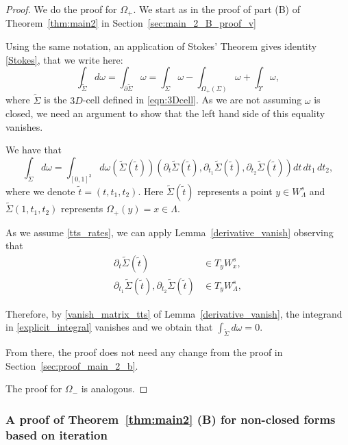 \documentclass[11pt]{amsart}
\theoremstyle{definition}
\theoremstyle{remark}
\numberwithin{equation}{section}
\begin{document}
  \begin{proof}
  We do the proof for $\Omega_+$.
    We start as in the proof of part (B) of
    Theorem~\ref{thm:main2} in Section~\ref{sec:main_2_B_proof_v}

    Using the same notation, an application of
    Stokes' Theorem gives identity \eqref{Stokes}, that we write here:
\[ \int_{\tilde\Sigma } d\omega =
\int_{\partial \tilde\Sigma}\omega =
\int_\Sigma \omega-\int_{\Omega_+(\Sigma)}\omega+\int_\Upsilon \omega,
\]
where $\tilde \Sigma$ is the $3D$-cell defined in \eqref{eqn:3Dcell}.
As we are not assuming $\omega$ is closed, we need an argument to show that the left hand side of this equality vanishes.

We have that
\begin{equation} \label{explicit_integral}
\int_{\tilde \Sigma} d\omega = \int_{[0,1]^3}
d\omega \left(\tilde \Sigma(\tilde t)\right) \left( \partial_t \tilde \Sigma(\tilde t),
\partial_{t_1}\tilde \Sigma(\tilde t), \partial_{t_2} \tilde \Sigma(\tilde t)\right)
dt \, dt_1 \, dt_2 ,
\end{equation}
where we denote $\tilde t=(t,t_1,t_2)$.
Here $\tilde \Sigma(\tilde t)$ represents a point $y\in W^s_\Lambda$ and
  $\tilde \Sigma(1,t_1,t_2)$ represents  $\Omega_+(y)=x\in\Lambda$.

As we assume \eqref{tts_rates}, we can apply Lemma~\ref{derivative_vanish}
observing that
\[
\begin{split}
 \partial_t \tilde \Sigma(\tilde t) &\in T_yW^s_{x} , \\
\partial_{t_1}\tilde \Sigma(\tilde t), \partial_{t_2} \tilde \Sigma(\tilde t) &\in   T_{y}W^s_{\Lambda} ,
\end{split}
\]

Therefore, by \eqref{vanish_matrix_tts} of Lemma~\ref{derivative_vanish},  the integrand in
\eqref{explicit_integral} vanishes and we
obtain that $\int_{\tilde \Sigma}  d\omega = 0$.

From there, the proof does not need any change from
the proof in Section~\ref{sec:proof_main_2_b}.

The proof for $\Omega_-$  is analogous.
\end{proof}





\subsubsection{A proof   of Theorem~\ref{thm:main2} (B) for non-closed forms
  based on iteration}
\label{sec:iteration}
\end{document}
